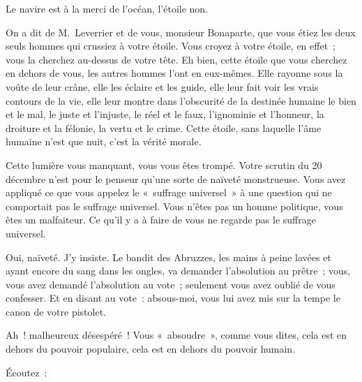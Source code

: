 \documentclass[french,twoside]{book} %
\begin{document}
Le navire est à la merci de l’océan, l’étoile non.\par
On a dit de M. Leverrier et de vous, monsieur Bonaparte, que vous étiez les deux seuls hommes qui crussiez à votre étoile. Vous croyez à votre étoile, en effet ; vous la cherchez au-dessus de votre tête. Eh bien, cette étoile que vous cherchez en dehors de vous, les autres hommes l’ont en eux-mêmes. Elle rayonne sous la voûte de leur crâne, elle les éclaire et les guide, elle leur fait voir les vrais contours de la vie, elle leur montre dans l’obscurité de la destinée humaine le bien et le mal, le juste et l’injuste, le réel et le faux, l’ignominie et l’honneur, la droiture et la félonie, la vertu et le crime. Cette étoile, sans laquelle l’âme humaine n’est que nuit, c’est la vérité morale.\par
Cette lumière vous manquant, vous vous êtes trompé. Votre scrutin du 20 décembre n’est pour le penseur qu’une sorte de naïveté monstrueuse. Vous avez appliqué ce que vous appelez le « suffrage universel » à une question qui ne comportait pas le suffrage universel. Vous n’êtes pas un homme politique, vous êtes un malfaiteur. Ce qu’il y a à faire de vous ne regarde pas le suffrage universel.\par
Oui, naïveté. J’y insiste. Le bandit des Abruzzes, les mains à peine lavées et ayant encore du sang dans les ongles, va demander l’absolution au prêtre ; vous, vous avez demandé l’absolution au vote ; seulement vous avez oublié de vous confesser. Et en disant au vote : absous-moi, vous lui avez mis sur la tempe le canon de votre pistolet.\par
Ah ! malheureux désespéré ! Vous « absoudre », comme vous dites, cela est en dehors du pouvoir populaire, cela est en dehors du pouvoir humain.\par
Écoutez :\par
\end{document}
